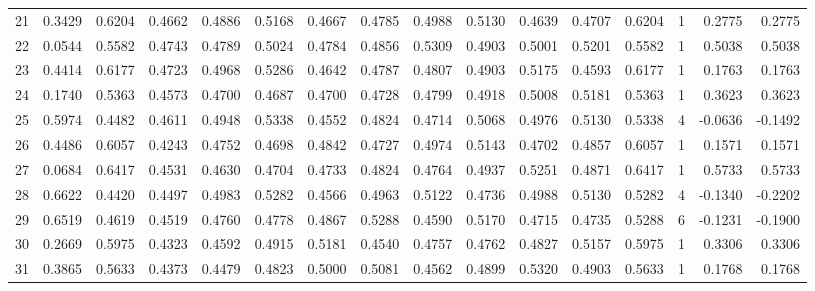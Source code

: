 \begin{tabular}{lrrrrrrrrrrrrrrr}
21  &      0.3429 &  0.6204 &  0.4662 &  0.4886 &  0.5168 &  0.4667 &  0.4785 &  0.4988 &  0.5130 &  0.4639 &   0.4707 &     0.6204 &      1 &                    0.2775 &                     0.2775 \\
22  &      0.0544 &  0.5582 &  0.4743 &  0.4789 &  0.5024 &  0.4784 &  0.4856 &  0.5309 &  0.4903 &  0.5001 &   0.5201 &     0.5582 &      1 &                    0.5038 &                     0.5038 \\
23  &      0.4414 &  0.6177 &  0.4723 &  0.4968 &  0.5286 &  0.4642 &  0.4787 &  0.4807 &  0.4903 &  0.5175 &   0.4593 &     0.6177 &      1 &                    0.1763 &                     0.1763 \\
24  &      0.1740 &  0.5363 &  0.4573 &  0.4700 &  0.4687 &  0.4700 &  0.4728 &  0.4799 &  0.4918 &  0.5008 &   0.5181 &     0.5363 &      1 &                    0.3623 &                     0.3623 \\
25  &      0.5974 &  0.4482 &  0.4611 &  0.4948 &  0.5338 &  0.4552 &  0.4824 &  0.4714 &  0.5068 &  0.4976 &   0.5130 &     0.5338 &      4 &                   -0.0636 &                    -0.1492 \\
26  &      0.4486 &  0.6057 &  0.4243 &  0.4752 &  0.4698 &  0.4842 &  0.4727 &  0.4974 &  0.5143 &  0.4702 &   0.4857 &     0.6057 &      1 &                    0.1571 &                     0.1571 \\
27  &      0.0684 &  0.6417 &  0.4531 &  0.4630 &  0.4704 &  0.4733 &  0.4824 &  0.4764 &  0.4937 &  0.5251 &   0.4871 &     0.6417 &      1 &                    0.5733 &                     0.5733 \\
28  &      0.6622 &  0.4420 &  0.4497 &  0.4983 &  0.5282 &  0.4566 &  0.4963 &  0.5122 &  0.4736 &  0.4988 &   0.5130 &     0.5282 &      4 &                   -0.1340 &                    -0.2202 \\
29  &      0.6519 &  0.4619 &  0.4519 &  0.4760 &  0.4778 &  0.4867 &  0.5288 &  0.4590 &  0.5170 &  0.4715 &   0.4735 &     0.5288 &      6 &                   -0.1231 &                    -0.1900 \\
30  &      0.2669 &  0.5975 &  0.4323 &  0.4592 &  0.4915 &  0.5181 &  0.4540 &  0.4757 &  0.4762 &  0.4827 &   0.5157 &     0.5975 &      1 &                    0.3306 &                     0.3306 \\
31  &      0.3865 &  0.5633 &  0.4373 &  0.4479 &  0.4823 &  0.5000 &  0.5081 &  0.4562 &  0.4899 &  0.5320 &   0.4903 &     0.5633 &      1 &                    0.1768 &                     0.1768 \\

\end{tabular}
